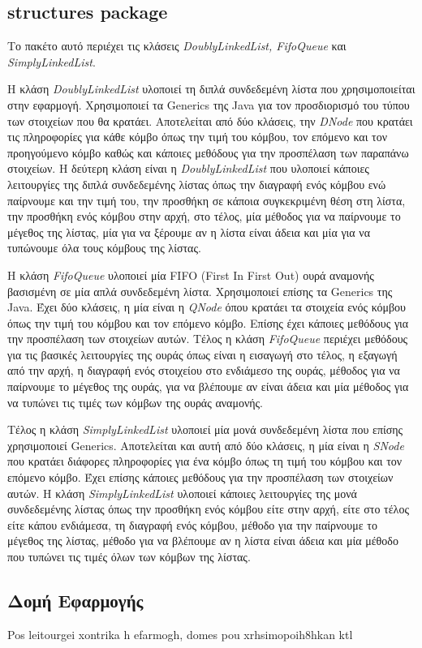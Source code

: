 \documentclass[a4paper]{article}
\begin{document}
\subsection{structures package}
Το πακέτο αυτό περιέχει τις κλάσεις \emph{DoublyLinkedList, FifoQueue} και
\emph{SimplyLinkedList}.

Η κλάση \emph{DoublyLinkedList} υλοποιεί τη διπλά συνδεδεμένη λίστα που
χρησιμοποιείται στην εφαρμογή. Χρησιμοποιεί τα Generics της Java για τον
προσδιορισμό του τύπου των στοιχείων που θα κρατάει. Αποτελείται από δύο
κλάσεις, την \emph{DNode} που κρατάει τις πληροφορίες για κάθε κόμβο όπως την
τιμή του κόμβου, τον επόμενο και τον προηγούμενο κόμβο καθώς και κάποιες
μεθόδους για την προσπέλαση των παραπάνω στοιχείων. Η δεύτερη κλάση είναι η
\emph{DoublyLinkedList} που υλοποιεί κάποιες λειτουργίες της διπλά συνδεδεμένης
λίστας όπως την διαγραφή ενός κόμβου ενώ παίρνουμε και την τιμή του, την
προσθήκη σε κάποια συγκεκριμένη θέση στη λίστα, την προσθήκη ενός κόμβου στην
αρχή, στο τέλος, μία μέθοδος για να παίρνουμε το μέγεθος της λίστας, μία για να
ξέρουμε αν η λίστα είναι άδεια και μία για να τυπώνουμε όλα τους κόμβους της
λίστας.

Η κλάση \emph{FifoQueue} υλοποιεί μία FIFO (First In First Out) ουρά αναμονής
βασισμένη σε μία απλά συνδεδεμένη λίστα. Χρησιμοποιεί επίσης τα Generics της
Java. Έχει δύο κλάσεις, η μία είναι η \emph{QNode} όπου κρατάει τα στοιχεία ενός
κόμβου όπως την τιμή του κόμβου και τον επόμενο κόμβο. Επίσης έχει κάποιες
μεθόδους για την προσπέλαση των στοιχείων αυτών. Τέλος η κλάση \emph{FifoQueue}
περιέχει μεθόδους για τις βασικές λειτουργίες της ουράς όπως είναι η εισαγωγή
στο τέλος, η εξαγωγή από την αρχή, η διαγραφή ενός στοιχείου στο ενδιάμεσο της
ουράς, μέθοδος για να παίρνουμε το μέγεθος της ουράς, για να βλέπουμε αν είναι
άδεια και μία μέθοδος για να τυπώνει τις τιμές των κόμβων της ουράς αναμονής.

Τέλος η κλάση \emph{SimplyLinkedList} υλοποιεί μία μονά συνδεδεμένη λίστα που
επίσης χρησιμοποιεί Generics. Αποτελείται και αυτή από δύο κλάσεις, η μία είναι η
\emph{SNode} που κρατάει διάφορες πληροφορίες για ένα κόμβο όπως τη τιμή του
κόμβου και τον επόμενο κόμβο. Έχει επίσης κάποιες μεθόδους για την προσπέλαση
των στοιχείων αυτών. Η κλάση \emph{SimplyLinkedList} υλοποιεί κάποιες
λειτουργίες της μονά συνδεδεμένης λίστας όπως την προσθήκη ενός κόμβου είτε στην
αρχή, είτε στο τέλος είτε κάπου ενδιάμεσα, τη διαγραφή ενός κόμβου, μέθοδο για
την παίρνουμε το μέγεθος της λίστας, μέθοδο για να βλέπουμε αν η λίστα είναι
άδεια και μία μέθοδο που τυπώνει τις τιμές όλων των κόμβων της λίστας.

\subsection{Δομή Εφαρμογής}
Pos leitourgei xontrika h efarmogh, domes pou xrhsimopoih8hkan ktl
\end{document}
